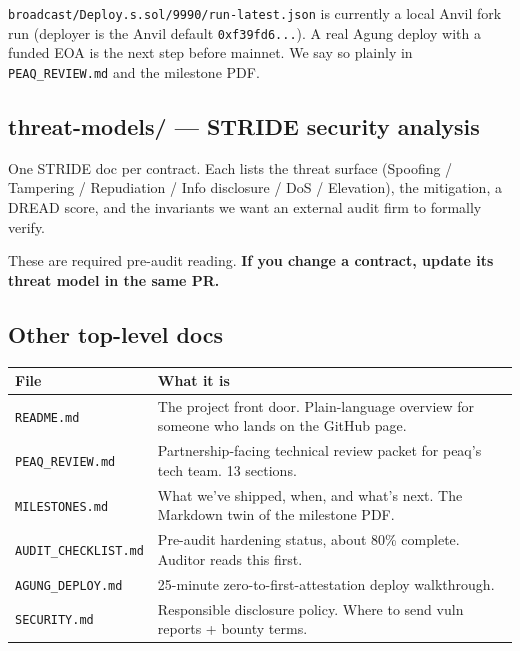 \documentclass[11pt,a4paper]{article}
\begin{document}
\begin{notebox}[title=Heads-up]
\texttt{broadcast/Deploy.s.sol/9990/run-latest.json} is currently a local Anvil fork run (deployer is the Anvil default \texttt{0xf39fd6...}). A real Agung deploy with a funded EOA is the next step before mainnet. We say so plainly in \texttt{PEAQ\_REVIEW.md} and the milestone PDF.
\end{notebox}

\subsection{threat-models/ --- STRIDE security analysis}

One STRIDE doc per contract. Each lists the threat surface (Spoofing / Tampering / Repudiation / Info disclosure / DoS / Elevation), the mitigation, a DREAD score, and the invariants we want an external audit firm to formally verify.

These are required pre-audit reading. \textbf{If you change a contract, update its threat model in the same PR.}

\subsection{Other top-level docs}

\begin{center}
\begin{tabular}{p{3.8cm} p{11.7cm}}
\toprule
{\bfseries\color{axiprimary}File} & {\bfseries\color{axiprimary}What it is} \\
\midrule
\texttt{README.md} & The project front door. Plain-language overview for someone who lands on the GitHub page. \\
\addlinespace[2pt]
\texttt{PEAQ\_REVIEW.md} & Partnership-facing technical review packet for peaq's tech team. 13 sections. \\
\addlinespace[2pt]
\texttt{MILESTONES.md} & What we've shipped, when, and what's next. The Markdown twin of the milestone PDF. \\
\addlinespace[2pt]
\texttt{AUDIT\_CHECKLIST.md} & Pre-audit hardening status, about 80\% complete. Auditor reads this first. \\
\addlinespace[2pt]
\texttt{AGUNG\_DEPLOY.md} & 25-minute zero-to-first-attestation deploy walkthrough. \\
\addlinespace[2pt]
\texttt{SECURITY.md} & Responsible disclosure policy. Where to send vuln reports + bounty terms. \\
\bottomrule
\end{tabular}
\end{center}
\end{document}
